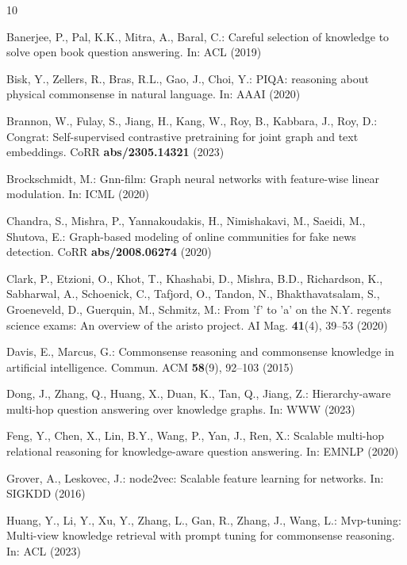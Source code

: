 \documentclass[runningheads]{llncs}
\begin{document}
%
%
\begin{thebibliography}{10}
\providecommand{\url}[1]{\texttt{#1}}
\providecommand{\urlprefix}{URL }
\providecommand{\doi}[1]{https://doi.org/#1}

Banerjee, P., Pal, K.K., Mitra, A., Baral, C.: Careful selection of knowledge
  to solve open book question answering. In: ACL (2019)

Bisk, Y., Zellers, R., Bras, R.L., Gao, J., Choi, Y.: {PIQA:} reasoning about
  physical commonsense in natural language. In: AAAI (2020)

Brannon, W., Fulay, S., Jiang, H., Kang, W., Roy, B., Kabbara, J., Roy, D.:
  Congrat: Self-supervised contrastive pretraining for joint graph and text
  embeddings. CoRR  \textbf{abs/2305.14321} (2023)

Brockschmidt, M.: Gnn-film: Graph neural networks with feature-wise linear
  modulation. In: ICML (2020)

Chandra, S., Mishra, P., Yannakoudakis, H., Nimishakavi, M., Saeidi, M.,
  Shutova, E.: Graph-based modeling of online communities for fake news
  detection. CoRR  \textbf{abs/2008.06274} (2020)

Clark, P., Etzioni, O., Khot, T., Khashabi, D., Mishra, B.D., Richardson, K.,
  Sabharwal, A., Schoenick, C., Tafjord, O., Tandon, N., Bhakthavatsalam, S.,
  Groeneveld, D., Guerquin, M., Schmitz, M.: From 'f' to 'a' on the {N.Y.}
  regents science exams: An overview of the aristo project. {AI} Mag.
  \textbf{41}(4),  39--53 (2020)

Davis, E., Marcus, G.: Commonsense reasoning and commonsense knowledge in
  artificial intelligence. Commun. {ACM}  \textbf{58}(9),  92--103 (2015)

Dong, J., Zhang, Q., Huang, X., Duan, K., Tan, Q., Jiang, Z.: Hierarchy-aware
  multi-hop question answering over knowledge graphs. In: WWW (2023)

Feng, Y., Chen, X., Lin, B.Y., Wang, P., Yan, J., Ren, X.: Scalable multi-hop
  relational reasoning for knowledge-aware question answering. In: EMNLP (2020)

Grover, A., Leskovec, J.: node2vec: Scalable feature learning for networks. In:
  SIGKDD (2016)

Huang, Y., Li, Y., Xu, Y., Zhang, L., Gan, R., Zhang, J., Wang, L.: Mvp-tuning:
  Multi-view knowledge retrieval with prompt tuning for commonsense reasoning.
  In: ACL (2023)


\end{thebibliography}
\end{document}
